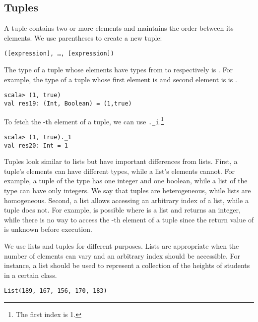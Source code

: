 \subsection{Tuples}

A tuple contains two or more elements and maintains the order between its
elements. We use parentheses to create a new tuple:

\begin{verbatim}
([expression], …, [expression])
\end{verbatim}

The type of a tuple whose elements have types from  to 
respectively is . For example, the type of a tuple
whose first element is  and second element is  is
.

\begin{verbatim}
scala> (1, true)
val res19: (Int, Boolean) = (1,true)
\end{verbatim}

To fetch the -th element of a tuple, we can use \verb+._i+.\footnote{The
first index is 1.}

\begin{verbatim}
scala> (1, true)._1
val res20: Int = 1
\end{verbatim}

Tuples look similar to lists but have important differences from
lists. First, a tuple's elements can have different types, while a list's
elements cannot. For example, a tuple of the type  has
one integer and one boolean, while a list of the type  can have
only integers. We say that tuples are heterogeneous, while lists are homogeneous.
Second, a list allows accessing an arbitrary index of a list,
while a tuple does not. For example,  is possible where  is
a list and  returns an integer, while there is no way to access the
-th element of a tuple since the return value of  is unknown
before execution.

We use lists and tuples for different purposes. Lists are appropriate when the
number of elements can vary and an arbitrary index should be accessible.
For instance, a list should be used to represent a collection of the heights of
students in a certain class.

\begin{verbatim}
List(189, 167, 156, 170, 183)
\end{verbatim}

